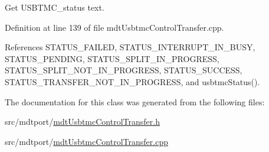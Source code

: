 Get U\-S\-B\-T\-M\-C\-\_\-status text. 



Definition at line 139 of file mdt\-Usbtmc\-Control\-Transfer.\-cpp.



References S\-T\-A\-T\-U\-S\-\_\-\-F\-A\-I\-L\-E\-D, S\-T\-A\-T\-U\-S\-\_\-\-I\-N\-T\-E\-R\-R\-U\-P\-T\-\_\-\-I\-N\-\_\-\-B\-U\-S\-Y, S\-T\-A\-T\-U\-S\-\_\-\-P\-E\-N\-D\-I\-N\-G, S\-T\-A\-T\-U\-S\-\_\-\-S\-P\-L\-I\-T\-\_\-\-I\-N\-\_\-\-P\-R\-O\-G\-R\-E\-S\-S, S\-T\-A\-T\-U\-S\-\_\-\-S\-P\-L\-I\-T\-\_\-\-N\-O\-T\-\_\-\-I\-N\-\_\-\-P\-R\-O\-G\-R\-E\-S\-S, S\-T\-A\-T\-U\-S\-\_\-\-S\-U\-C\-C\-E\-S\-S, S\-T\-A\-T\-U\-S\-\_\-\-T\-R\-A\-N\-S\-F\-E\-R\-\_\-\-N\-O\-T\-\_\-\-I\-N\-\_\-\-P\-R\-O\-G\-R\-E\-S\-S, and usbtmc\-Status().



The documentation for this class was generated from the following files\-:\begin{DoxyCompactItemize}
\item 
src/mdtport/\hyperlink{mdt_usbtmc_control_transfer_8h}{mdt\-Usbtmc\-Control\-Transfer.\-h}\item 
src/mdtport/\hyperlink{mdt_usbtmc_control_transfer_8cpp}{mdt\-Usbtmc\-Control\-Transfer.\-cpp}\end{DoxyCompactItemize}
